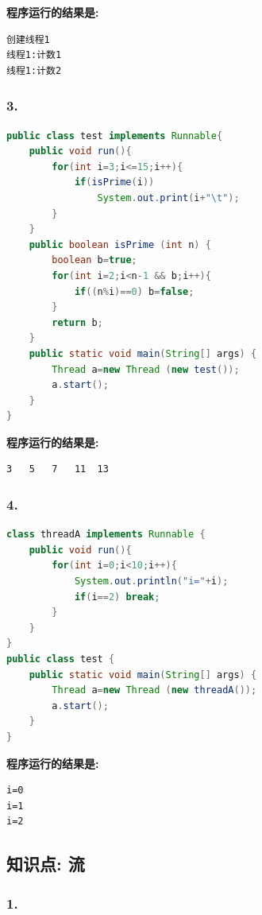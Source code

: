 \documentclass[a4paper,12pt]{article}
\begin{document}
\textbf{程序运行的结果是:}
\begin{lstlisting}[style=output]
创建线程1
线程1:计数1
线程1:计数2
\end{lstlisting}

\subsubsection{3.}

\begin{lstlisting}[language=Java, caption=输出素数]
public class test implements Runnable{ 
    public void run(){ 
        for(int i=3;i<=15;i++){ 
            if(isPrime(i)) 
                System.out.print(i+"\t");
        }
    }
    public boolean isPrime (int n) {
        boolean b=true;
        for(int i=2;i<n-1 && b;i++){
            if((n%i)==0) b=false;
        }
        return b;
    }
    public static void main(String[] args) {
        Thread a=new Thread (new test());
        a.start();
    }
}
\end{lstlisting}

\textbf{程序运行的结果是:}
\begin{lstlisting}[style=output]
3	5	7	11	13	
\end{lstlisting}

\subsubsection{4.}

\begin{lstlisting}[language=Java, caption=线程中断示例]
class threadA implements Runnable {
    public void run(){
        for(int i=0;i<10;i++){
            System.out.println("i="+i);
            if(i==2) break;
        }
    }
}
public class test {
    public static void main(String[] args) {
        Thread a=new Thread (new threadA());
        a.start();
    }
}
\end{lstlisting}

\textbf{程序运行的结果是:}
\begin{lstlisting}[style=output]
i=0
i=1
i=2
\end{lstlisting}

\subsection{知识点: 流}

\subsubsection{1.}
\end{document}
